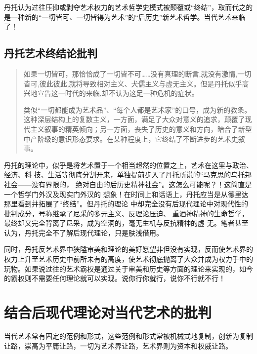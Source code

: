 丹托认为过往压抑或剥夺艺术权力的艺术哲学史模式被颠覆或“终结”，取而代之的是一种新的“一切皆可、一切皆得为艺术”的“后历史”新艺术哲学。当代艺术来临了！

\subsection{丹托艺术终结论批判}

\begin{quotation}

如果一切皆可，那恰恰成了一切皆不可……没有真理的断言,就没有激情,一切皆可,彼此彼此,就将导致相对主义、犬儒主义与虚无主义。但是丹托似乎高兴地宣告这一时代的来临,却不认为这足一种危机的症状。\cite{fuwendantuo}

类似“一切都能成为艺术品”、“每个人都是艺术家”的口号，成为新的教条。这种深层结构上的复数主义，一方面，满足了大众对意义的追求，颠覆了现代主义叙事的精英倾向；另一方面，丧失了历史的意义和方向，暗合了新型中产阶级的意识形态要求。在某种程度上，它终结了不断进步的艺术史叙事。\cite{dantuozhenduan}
\end{quotation}

丹托的理论中，似乎是将艺术置于一个相当超然的位置之上，艺术在这里与政治、经济、科
技、生活等彻底分割开来，单独提前步入了丹托所说的“马克思的乌托邦社会——没有界限的，
绝对自由的后历史精神社会”。这怎么可能呢？！这简直是一个哲学门外汉及现实门外汉的
想象！在时间上和话语上，丹托应当是从德里达那里看到并拓展了“终结”。但丹托的理论
中却完全没有后现代理论中对现代性的批判成分，号称继承了尼采的多元主义、反理论压迫、
重酒神精神的生命哲学，最终却又完全背离了尼采，成为空洞的，毫无生机与反抗精神的虚
无。笔者甚至认为，丹托完全不了解后现代理论，只是肤浅借用。

同时，丹托反艺术界中狭隘审美和理论的美好愿望非但没有实现，反而使艺术界的权力上升至艺术历史中前所未有的高度，使艺术彻底抛离了大众并成为权力手中的玩物。如果说过往的艺术霸权是通过关于审美和历史等方面的理论来实现的，如今的霸权则不需要任何理论就可以实现。说你行你就行，说你不行就不行！

\section{结合后现代理论对当代艺术的批判}

当代艺术常有固定的范例和形式，这些范例和形式常被机械式地复制，创新为复制让路，崇高为平庸让路，一切为艺术界让路，艺术界则为资本和权威让路。

